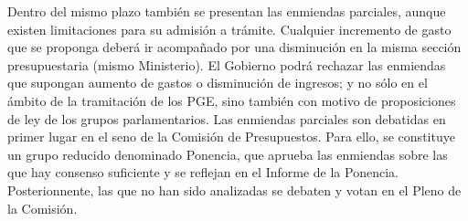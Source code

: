 \documentclass[10pt,a4paper]{article}
\begin{document}
Dentro del mismo plazo también se presentan las enmiendas parciales, aunque existen limitaciones para su admisión a trámite. Cualquier incremento de gasto que se proponga deberá ir acompañado por una disminución en la misma sección presupuestaria (mismo Ministerio). El Gobierno podrá rechazar las enmiendas que supongan aumento de gastos o disminución de ingresos; y no sólo en el ámbito de la tramitación de los PGE, sino también con motivo de proposiciones de ley de los grupos parlamentarios. Las enmiendas parciales son debatidas en primer lugar en el seno de la Comisión de Presupuestos. Para ello, se constituye un grupo reducido denominado Ponencia, que aprueba las enmiendas sobre las que hay consenso suficiente y se reflejan en el Informe de la Ponencia. Posterionnente, las que no han sido analizadas se debaten y votan en el Pleno de la Comisión. 
\end{document}
